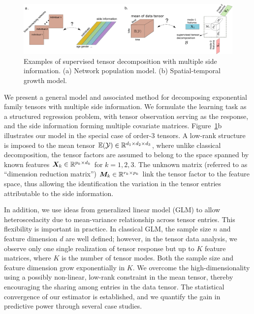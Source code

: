 \documentclass[12pt]{article}
\theoremstyle{plain}
\theoremstyle{definition}
\begin{document}
\begin{figure}[t]
\begin{center}
\includegraphics[width=16cm]{new_introfigure1.pdf}
\end{center}
\caption{Examples of supervised tensor decomposition with multiple side information. (a) Network population model. (b) Spatial-temporal growth model. }\label{fig:intro1}
\end{figure}

We present a general model and associated method for decomposing exponential family tensors with multiple side information. 
We formulate the learning task as a structured regression problem, with tensor observation serving as the response, and the side information forming multiple covariate matrices. Figure~\ref{fig:intro1}b illustrates our model in the special case of order-3 tensors. A low-rank structure is imposed to the mean tensor $\mathbb{E}(\mathcal{Y})\in\mathbb{R}^{d_1\times d_2\times d_3}$, where unlike classical decomposition, the tensor factors are assumed to belong to the space spanned by known features $\bm X_k\in\mathbb{R}^{p_k\times d_k}$ for $k=1,2,3$. The unknown matrix (referred to as ``dimension reduction matrix'') $\bm M_k\in\mathbb{R}^{r_k\times p_k}$ link the tensor factor to the feature space, thus allowing the identification the variation in the tensor entries attributable to the side information.

In addition, we use ideas from generalized linear model (GLM) to allow heteroscedacity due to mean-variance relationship across tensor entries. This flexibility is important in practice. In classical GLM, the sample size $n$ and feature dimension $d$ are well defined; however, in the tensor data analysis, we observe only one single realization of tensor response but up to $K$ feature matrices, where $K$ is the number of tensor modes.  Both the sample size and feature dimension grow exponentially in $K$. We overcome the high-dimensionality using a possibly non-linear, low-rank constraint in the mean tensor, thereby encouraging the sharing among entries in the data tensor. The statistical convergence of our estimator is established, and we quantify the gain in predictive power through several case studies. 
 
\end{document}

